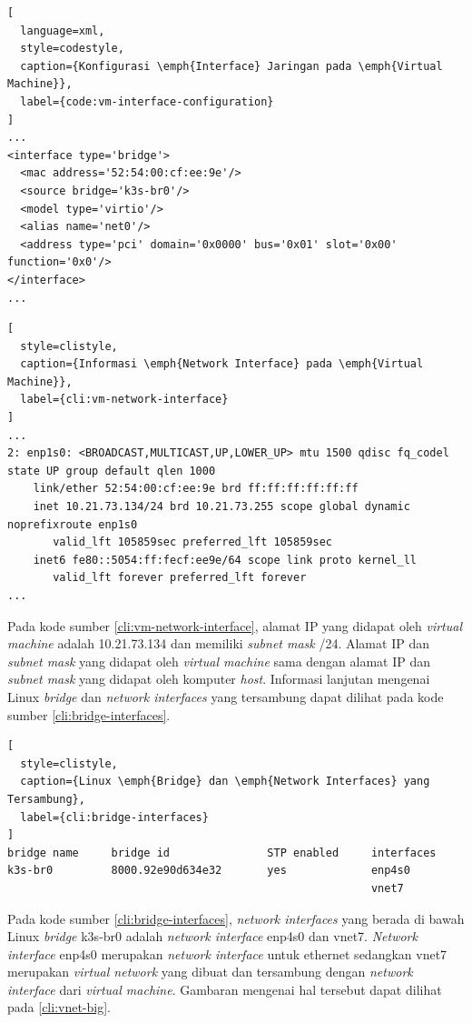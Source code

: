 \begin{lstlisting}[
  language=xml,
  style=codestyle,
  caption={Konfigurasi \emph{Interface} Jaringan pada \emph{Virtual Machine}},
  label={code:vm-interface-configuration}
]
...
<interface type='bridge'>
  <mac address='52:54:00:cf:ee:9e'/>
  <source bridge='k3s-br0'/>
  <model type='virtio'/>
  <alias name='net0'/>
  <address type='pci' domain='0x0000' bus='0x01' slot='0x00' function='0x0'/>
</interface>
...
\end{lstlisting}

\begin{lstlisting}[
  style=clistyle,
  caption={Informasi \emph{Network Interface} pada \emph{Virtual Machine}},
  label={cli:vm-network-interface}
]
...
2: enp1s0: <BROADCAST,MULTICAST,UP,LOWER_UP> mtu 1500 qdisc fq_codel state UP group default qlen 1000
    link/ether 52:54:00:cf:ee:9e brd ff:ff:ff:ff:ff:ff
    inet 10.21.73.134/24 brd 10.21.73.255 scope global dynamic noprefixroute enp1s0
       valid_lft 105859sec preferred_lft 105859sec
    inet6 fe80::5054:ff:fecf:ee9e/64 scope link proto kernel_ll
       valid_lft forever preferred_lft forever
...
\end{lstlisting}

Pada kode sumber \ref{cli:vm-network-interface}, alamat IP yang didapat oleh
\emph{virtual machine} adalah 10.21.73.134 dan memiliki \emph{subnet mask} /24.
Alamat IP dan \emph{subnet mask} yang didapat oleh \emph{virtual machine} sama
dengan alamat IP dan \emph{subnet mask} yang didapat oleh komputer \emph{host}.
Informasi lanjutan mengenai Linux \emph{bridge} dan \emph{network interfaces}
yang tersambung dapat dilihat pada kode sumber \ref{cli:bridge-interfaces}.

\begin{lstlisting}[
  style=clistyle,
  caption={Linux \emph{Bridge} dan \emph{Network Interfaces} yang Tersambung},
  label={cli:bridge-interfaces}
]
bridge name     bridge id               STP enabled     interfaces
k3s-br0         8000.92e90d634e32       yes             enp4s0
                                                        vnet7
\end{lstlisting}

Pada kode sumber \ref{cli:bridge-interfaces}, \emph{network interfaces} yang
berada di bawah Linux \emph{bridge} k3s-br0 adalah \emph{network interface}
enp4s0 dan vnet7. \emph{Network interface} enp4s0 merupakan \emph{network interface}
untuk ethernet sedangkan vnet7 merupakan \emph{virtual network} yang dibuat
dan tersambung dengan \emph{network interface} dari \emph{virtual machine}.
Gambaran mengenai hal tersebut dapat dilihat pada \ref{cli:vnet-big}.

